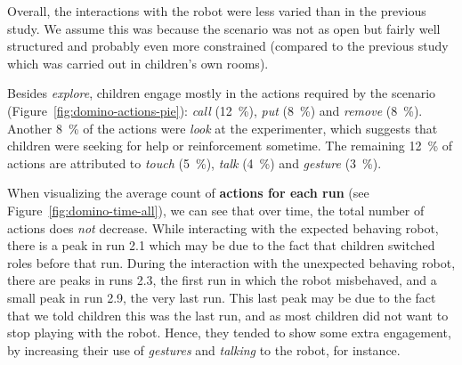 \documentclass{sig-alternate}
\begin{document}
Overall, the interactions with the robot were less varied than in the previous
study. We assume this was because the scenario was not as open but fairly well
structured and probably even more constrained (compared to the previous study
which was carried out in children's own rooms).


Besides \textit{explore}, children engage mostly in the actions required by the
scenario (Figure~\ref{fig:domino-actions-pie}): \textit{call} (12~\%),
\textit{put} (8~\%) and \textit{remove} (8~\%). Another 8~\% of the actions were
\textit{look} at the experimenter, which suggests that children were seeking for
help or reinforcement sometime. The remaining 12~\% of actions are attributed to
\textit{touch} (5~\%), \textit{talk} (4~\%) and \textit{gesture} (3~\%). 



When visualizing the average count of \textbf{actions for each run} (see
Figure~\ref{fig:domino-time-all}), we can see that over time, the total number
of actions does \textit{not} decrease. While interacting with the expected
behaving robot, there is a peak in run 2.1 which may be due to the fact that
children switched roles before that run. During the interaction with the
unexpected behaving robot, there are peaks in runs 2.3, the first run in which
the robot misbehaved, and a small peak in run 2.9, the very last run. This last
peak may be due to the fact that we told children this was the last run, and as
most children did not want to stop playing with the robot. Hence, they tended to
show some extra engagement, by increasing their use of \textit{gestures} and
\textit{talking} to the robot, for instance.
\end{document}
